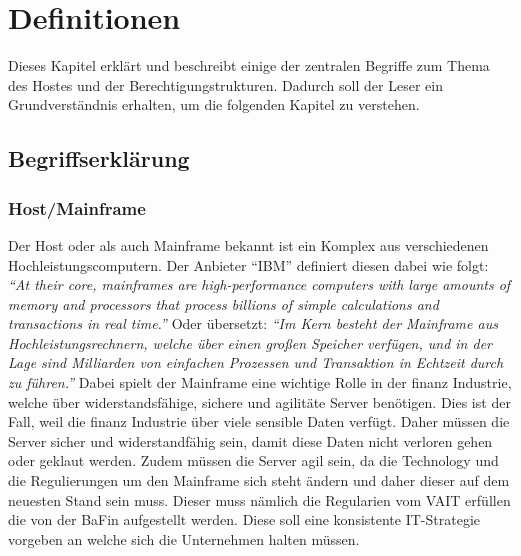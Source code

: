 \chapter{Definitionen}
\label{ch:chapter02}
Dieses Kapitel erklärt und beschreibt einige der zentralen Begriffe zum Thema des Hostes und der Berechtigungstrukturen.
Dadurch soll der Leser ein Grundverständnis erhalten, um die folgenden Kapitel zu verstehen.

%
%
\section{Begriffserklärung}
\label{sec:Bergriff}

\subsection{Host/Mainframe}
\label{sec:Host}
Der Host oder als auch Mainframe bekannt ist ein Komplex aus verschiedenen Hochleistungscomputern.
Der Anbieter "`IBM"' definiert diesen dabei wie folgt: 
\newline
\newline
\textit{"`At their core, mainframes are high-performance computers with large amounts of memory and processors that process billions of simple calculations and transactions in real time."'} \cite{Mainframe}
\newline
\newline
Oder übersetzt:
\newline
\newline
\textit{"`Im Kern besteht der Mainframe aus Hochleistungsrechnern, welche über einen großen Speicher verfügen, und in der Lage sind Milliarden von einfachen Prozessen und Transaktion in Echtzeit durch zu führen."'} \cite{Mainframe}
\newline
\newline
Dabei spielt der Mainframe eine wichtige Rolle in der finanz Industrie, welche über widerstandsfähige, sichere und agilitäte Server benötigen.
Dies ist der Fall, weil die finanz Industrie über viele sensible Daten verfügt.
Daher müssen die Server sicher und widerstandfähig sein, damit diese Daten nicht verloren gehen oder geklaut werden.
Zudem müssen die Server agil sein, da die Technology und die Regulierungen um den Mainframe sich steht ändern und daher dieser auf dem neuesten Stand sein muss.
Dieser muss nämlich die Regularien vom \ac{VAIT} erfüllen die von der \ac{BaFin} aufgestellt werden.
Diese soll eine konsistente IT-Strategie vorgeben an welche sich die Unternehmen halten müssen. \cite{Vait}

